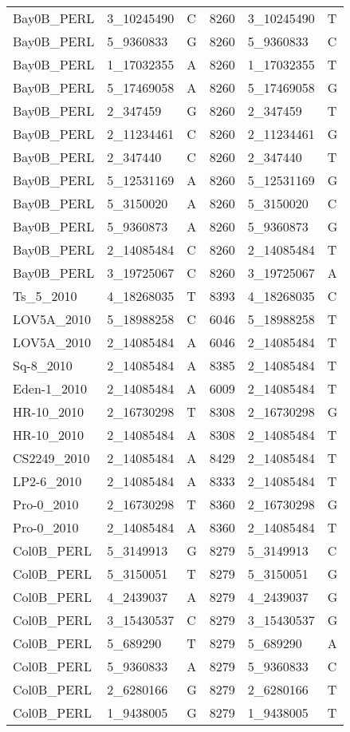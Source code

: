\begin{center}
\begin{longtable}{|l|l|l|l|l|l|}
Bay0B\_PERL&3\_10245490&C&8260&3\_10245490&T\\
Bay0B\_PERL&5\_9360833&G&8260&5\_9360833&C\\
Bay0B\_PERL&1\_17032355&A&8260&1\_17032355&T\\
Bay0B\_PERL&5\_17469058&A&8260&5\_17469058&G\\
Bay0B\_PERL&2\_347459&G&8260&2\_347459&T\\
Bay0B\_PERL&2\_11234461&C&8260&2\_11234461&G\\
Bay0B\_PERL&2\_347440&C&8260&2\_347440&T\\
Bay0B\_PERL&5\_12531169&A&8260&5\_12531169&G\\
Bay0B\_PERL&5\_3150020&A&8260&5\_3150020&C\\
Bay0B\_PERL&5\_9360873&A&8260&5\_9360873&G\\
Bay0B\_PERL&2\_14085484&C&8260&2\_14085484&T\\
Bay0B\_PERL&3\_19725067&C&8260&3\_19725067&A\\
Ts\_5\_2010&4\_18268035&T&8393&4\_18268035&C\\
LOV5A\_2010&5\_18988258&C&6046&5\_18988258&T\\
LOV5A\_2010&2\_14085484&A&6046&2\_14085484&T\\
Sq-8\_2010&2\_14085484&A&8385&2\_14085484&T\\
Eden-1\_2010&2\_14085484&A&6009&2\_14085484&T\\
HR-10\_2010&2\_16730298&T&8308&2\_16730298&G\\
HR-10\_2010&2\_14085484&A&8308&2\_14085484&T\\
CS2249\_2010&2\_14085484&A&8429&2\_14085484&T\\
LP2-6\_2010&2\_14085484&A&8333&2\_14085484&T\\
Pro-0\_2010&2\_16730298&T&8360&2\_16730298&G\\
Pro-0\_2010&2\_14085484&A&8360&2\_14085484&T\\
Col0B\_PERL&5\_3149913&G&8279&5\_3149913&C\\
Col0B\_PERL&5\_3150051&T&8279&5\_3150051&G\\
Col0B\_PERL&4\_2439037&A&8279&4\_2439037&G\\
Col0B\_PERL&3\_15430537&C&8279&3\_15430537&G\\
Col0B\_PERL&5\_689290&T&8279&5\_689290&A\\
Col0B\_PERL&5\_9360833&A&8279&5\_9360833&C\\
Col0B\_PERL&2\_6280166&G&8279&2\_6280166&T\\
Col0B\_PERL&1\_9438005&G&8279&1\_9438005&T\\

\end{longtable}
\end{center}
